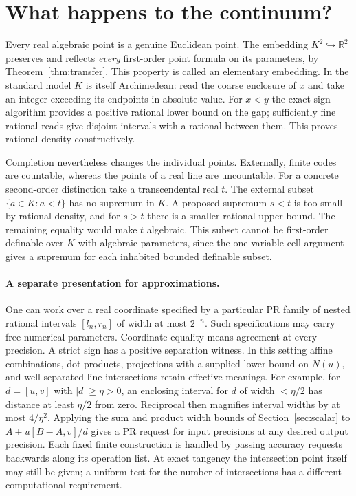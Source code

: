 \section{What happens to the continuum?}
Every real algebraic point is a genuine Euclidean point. The embedding
$K^2\hookrightarrow\mathbb R^2$ preserves and reflects \emph{every}
first-order point formula on its parameters, by Theorem~\ref{thm:transfer}.
This property is called an elementary embedding. In the standard model
$K$ is itself Archimedean: read the coarse enclosure of $x$ and take an
integer exceeding its endpoints in absolute value. For $x<y$ the exact
sign algorithm provides a positive rational lower bound on the gap;
sufficiently fine rational reads give disjoint intervals with a rational
between them. This proves rational density constructively.

Completion nevertheless changes the individual points. Externally, finite
codes are countable, whereas the points of a real line are uncountable.
For a concrete second-order distinction take a transcendental real $t$.
The external subset $\{a\in K:a<t\}$ has no supremum in $K$. A proposed
supremum $s<t$ is too small by rational density, and for $s>t$ there
is a smaller rational upper bound. The remaining equality would make
$t$ algebraic. This subset cannot be first-order definable over $K$ with
algebraic parameters, since the one-variable cell argument gives a
supremum for each inhabited bounded definable subset.

\paragraph{A separate presentation for approximations.}
One can work over a real coordinate specified by a particular PR family
of nested rational intervals $[l_n,r_n]$ of width at most $2^{-n}$.
Such specifications may carry free numerical parameters. Coordinate
equality means agreement at every precision. A strict sign has a
positive separation witness. In this setting affine combinations, dot
products, projections with a supplied lower bound on $N(u)$, and
well-separated line intersections retain effective meanings. For example,
for $d=[u,v]$ with $|d|\ge\eta>0$, an enclosing interval for $d$
of width $<\eta/2$ has distance at least $\eta/2$ from zero. Reciprocal
then magnifies interval widths by at most $4/\eta^2$. Applying the
sum and product width bounds of Section~\ref{sec:scalar} to
$A+u[B-A,v]/d$ gives a PR request for input precisions at any desired
output precision. Each fixed finite construction is handled by passing
accuracy requests backwards along its operation list. At exact tangency
the intersection point itself may still be given; a uniform test for the
number of intersections has a different computational requirement.

